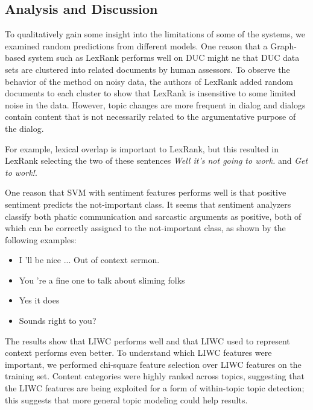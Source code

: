 \documentclass[11pt]{article}
\begin{document}
\subsection{Analysis and Discussion}
\label{sec:analysis}
To qualitatively gain some insight into the limitations of some of the
systems, we examined random predictions from different models.  One
reason that a Graph-based system such as LexRank performs well on DUC
might ne that DUC data sets are clustered into
related documents by human assessors. To observe the behavior of the
method on noisy data, the authors of LexRank added random documents to
each cluster to show that LexRank is
insensitive to some limited noise in the data. 
However, topic changes are more frequent in dialog and
dialogs contain content that is not necessarily related to
the argumentative purpose of the dialog. 

For example, lexical overlap is important to LexRank, but this
resulted in LexRank selecting the two of these sentences {\it Well it's not
  going to work.} and {\it Get to work!}.

One reason that  SVM with sentiment features
performs well is that positive sentiment 
predicts the not-important class. It seems that sentiment
analyzers classify both phatic
communication and sarcastic arguments as positive, both
of which can be correctly assigned to the not-important
class, as shown by the following examples:

\begin{small}
\begin{itemize}
\item  I 'll be nice ... Out of context
  sermon.
\item You 're a fine one to talk about   sliming folks
\item Yes it does
\item Sounds right to you?
\end{itemize}
\end{small}

The results show that LIWC performs well and that LIWC used to represent
context performs even better. To understand which LIWC features
were important, we
performed chi-square feature selection over LIWC features on the
training set. Content categories were highly ranked across topics,
suggesting that the LIWC features are being exploited for a form of
within-topic topic detection; this suggests that more general topic
modeling could help results.
\end{document}
